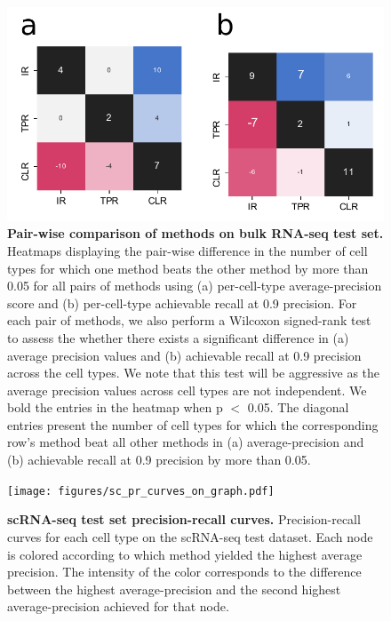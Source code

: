\begin{figure}[htbp]
    \centerline{\includegraphics[width=13cm]{figures/sc_pairwise_heatmaps.pdf}}
    \caption{\textbf{Pair-wise comparison of methods on bulk RNA-seq test set.} Heatmaps displaying the pair-wise difference in the number of cell types for which one method beats the other method by more than 0.05 for all pairs of methods using (a) per-cell-type average-precision score and (b) per-cell-type achievable recall at 0.9 precision. For each pair of methods, we also perform a Wilcoxon signed-rank test to assess the whether there exists a significant difference in (a) average precision values and (b) achievable recall at 0.9 precision across the cell types.  We note that this test will be aggressive as the average precision values across cell types are not independent. We bold the entries in the heatmap when p $<$ 0.05.  The diagonal entries present the number of cell types for which the corresponding row's method beat all other methods in (a) average-precision and (b) achievable recall at 0.9 precision by more than 0.05.}
    \label{fig:sc_pairwise}
      \end{figure}

 \clearpage
\begin{figure}%
    \thispagestyle{empty}
    \hspace{-7cm}
    \centering
    {{\texttt{[image: figures/sc\_pr\_curves\_on\_graph.pdf]} }}%
    \qquad
    {}%
    \caption{\textbf{scRNA-seq test set precision-recall curves.} Precision-recall curves for each cell type on the scRNA-seq test dataset. Each node is colored according to which method yielded the highest average precision. The intensity of the color corresponds to the difference between the highest average-precision and the second highest average-precision achieved for that node.}%
    \label{fig:sc_pr_curves}%
\end{figure}
\clearpage


